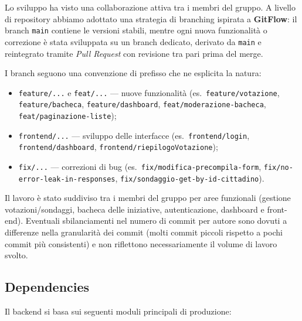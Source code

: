 \documentclass{article}
\newcommand{\code}[1]{\texttt{\small #1}}
\begin{document}
Lo sviluppo ha visto una collaborazione attiva tra i membri del gruppo. A livello di
repository abbiamo adottato una strategia di branching ispirata a \textbf{GitFlow}: il branch
\code{main} contiene le versioni stabili, mentre ogni nuova funzionalità o correzione è stata
sviluppata su un branch dedicato, derivato da \code{main} e reintegrato tramite
\textit{Pull Request} con revisione tra pari prima del merge.

I branch seguono una convenzione di prefisso che ne esplicita la natura:
\begin{itemize}
	\item \code{feature/...} e \code{feat/...} --- nuove funzionalità (es.\ \code{feature/votazione},
	\code{feature/bacheca}, \code{feature/dashboard}, \code{feat/moderazione-bacheca},
	\code{feat/paginazione-liste});
	\item \code{frontend/...} --- sviluppo delle interfacce (es.\ \code{frontend/login},
	\code{frontend/dashboard}, \code{frontend/riepilogoVotazione});
	\item \code{fix/...} --- correzioni di bug (es.\ \code{fix/modifica-precompila-form},
	\code{fix/no-error-leak-in-responses}, \code{fix/sondaggio-get-by-id-cittadino}).
\end{itemize}

Il lavoro è stato suddiviso tra i membri del gruppo per aree funzionali (gestione
votazioni/sondaggi, bacheca delle iniziative, autenticazione, dashboard e front-end).
Eventuali sbilanciamenti nel numero di commit per autore sono dovuti a differenze nella
granularità dei commit (molti commit piccoli rispetto a pochi commit più consistenti) e non
riflettono necessariamente il volume di lavoro svolto.

\subsection{Dependencies}

Il backend si basa sui seguenti moduli principali di produzione:
\end{document}
